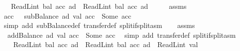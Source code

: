 \begin{isabellebody}
\ \ \ {\isachardoublequoteopen}ReadL\isactrlsub i\isactrlsub n\isactrlsub t\ {\isacharparenleft}{\kern0pt}bal\ {\isacharparenleft}{\kern0pt}acc\ ad{\isacharparenright}{\kern0pt}{\isacharparenright}{\kern0pt}\ {\isacharequal}{\kern0pt}\ ReadL\isactrlsub i\isactrlsub n\isactrlsub t\ {\isacharparenleft}{\kern0pt}bal\ {\isacharparenleft}{\kern0pt}acc{\isacharprime}{\kern0pt}\ ad{\isacharparenright}{\kern0pt}{\isacharparenright}{\kern0pt}{\isachardoublequoteclose}\isanewline
%
\isadelimproof
%
\endisadelimproof
%
\isatagproof
{}\isamarkupfalse%
\ {\isacharminus}{\kern0pt}\isanewline
\ \ \isamarkupfalse%
\ assms\ \isamarkupfalse%
\ acc{\isacharprime}{\kern0pt}{\isacharprime}{\kern0pt}\ \ {\isacharasterisk}{\kern0pt}{\isacharcolon}{\kern0pt}\ {\isachardoublequoteopen}subBalance\ ad\ val\ acc\ {\isacharequal}{\kern0pt}\ Some\ acc{\isacharprime}{\kern0pt}{\isacharprime}{\kern0pt}{\isachardoublequoteclose}\ \isamarkupfalse%
\ {\isacharparenleft}{\kern0pt}simp\ add{\isacharcolon}{\kern0pt}\ subBalance{\isacharunderscore}{\kern0pt}def\ transfer{\isacharunderscore}{\kern0pt}def\ split{\isacharcolon}{\kern0pt}if{\isacharunderscore}{\kern0pt}split{\isacharunderscore}{\kern0pt}asm{\isacharparenright}{\kern0pt}\isanewline
\ \ \isamarkupfalse%
\ assms\ \isamarkupfalse%
\ {\isacharasterisk}{\kern0pt}{\isacharasterisk}{\kern0pt}{\isacharcolon}{\kern0pt}\ {\isachardoublequoteopen}addBalance\ ad\ val\ acc{\isacharprime}{\kern0pt}{\isacharprime}{\kern0pt}\ {\isacharequal}{\kern0pt}\ Some\ acc{\isacharprime}{\kern0pt}{\isachardoublequoteclose}\ \isamarkupfalse%
\ {\isacharparenleft}{\kern0pt}simp\ add{\isacharcolon}{\kern0pt}\ transfer{\isacharunderscore}{\kern0pt}def\ split{\isacharcolon}{\kern0pt}if{\isacharunderscore}{\kern0pt}split{\isacharunderscore}{\kern0pt}asm{\isacharparenright}{\kern0pt}\isanewline
\ \ \isamarkupfalse%
\ \isamarkupfalse%
\ {\isacharasterisk}{\kern0pt}\ \isamarkupfalse%
\ {\isachardoublequoteopen}ReadL\isactrlsub i\isactrlsub n\isactrlsub t\ {\isacharparenleft}{\kern0pt}bal\ {\isacharparenleft}{\kern0pt}acc{\isacharprime}{\kern0pt}{\isacharprime}{\kern0pt}\ ad{\isacharparenright}{\kern0pt}{\isacharparenright}{\kern0pt}\ {\isacharequal}{\kern0pt}\ ReadL\isactrlsub i\isactrlsub n\isactrlsub t\ {\isacharparenleft}{\kern0pt}bal\ {\isacharparenleft}{\kern0pt}acc\ ad{\isacharparenright}{\kern0pt}{\isacharparenright}{\kern0pt}\ {\isacharminus}{\kern0pt}\ ReadL\isactrlsub i\isactrlsub n\isactrlsub t\ val{\isachardoublequoteclose}\ \isamarkupfalse%

\end{isabellebody}
